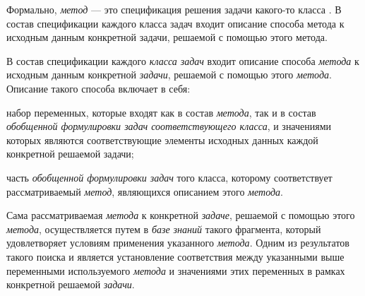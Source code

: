Формально, \textit{метод} --- это спецификация решения задачи какого-то класса . В состав спецификации каждого класса задач входит описание способа  метода к исходным данным конкретной задачи, решаемой с помощью этого метода.

\begin{SCn}
\end{SCn}

В состав спецификации каждого \textit{класса задач} входит описание способа  \textit{метода} к исходным данным конкретной \textit{задачи}, решаемой с помощью этого \textit{метода}. Описание такого способа  включает в себя:
\begin{textitemize}
	\item набор переменных, которые входят как в состав \textit{метода}, так и в состав \textit{обобщенной формулировки задач соответствующего класса}, и значениями которых являются соответствующие элементы исходных данных каждой конкретной решаемой задачи;
	\item часть \textit{обобщенной формулировки задач} того класса, которому соответствует рассматриваемый \textit{метод}, являющихся описанием  этого \textit{метода}.
\end{textitemize}

Сама рассматриваемая  \textit{метода} к конкретной \textit{задаче}, решаемой с помощью этого \textit{метода}, осуществляется путем  в \textit{базе знаний} такого фрагмента, который удовлетворяет условиям применения указанного \textit{метода}. Одним из результатов такого поиска и является установление соответствия между указанными выше переменными используемого \textit{метода} и значениями этих переменных в рамках конкретной решаемой \textit{задачи}.


